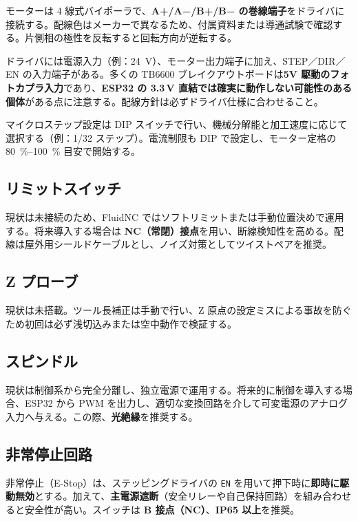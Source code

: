 \documentclass[uplatex,dvipdfmx]{ujarticle}
\begin{document}
モーターは 4 線式バイポーラで、\textbf{A+/A−/B+/B− の巻線端子}をドライバに接続する。配線色はメーカーで異なるため、付属資料または導通試験で確認する。片側相の極性を反転すると回転方向が逆転する。

ドライバには電源入力（例：\SI{24}{\volt}）、モーター出力端子に加え、STEP／DIR／EN の入力端子がある。多くの TB6600 \cite{tb6600}ブレイクアウトボードは\textbf{5V 駆動のフォトカプラ入力}であり、\textbf{ESP32 の 3.3\,V 直結では確実に動作しない可能性のある個体}がある点に注意する。配線方針は必ずドライバ仕様に合わせること。


マイクロステップ設定は DIP スイッチで行い、機械分解能と加工速度に応じて選択する（例：1/32 ステップ）。電流制限も DIP で設定し、モーター定格の \SIrange{80}{100}{\percent} 目安で開始する。

\subsection{リミットスイッチ}

現状は未接続のため、FluidNC ではソフトリミットまたは手動位置決めで運用する。将来導入する場合は \textbf{NC（常閉）接点}を用い、断線検知性を高める。配線は屋外用シールドケーブルとし、ノイズ対策としてツイストペアを推奨。

\subsection{Z プローブ}

現状は未搭載。ツール長補正は手動で行い、Z 原点の設定ミスによる事故を防ぐため初回は必ず浅切込みまたは空中動作で検証する。

\subsection{スピンドル}

現状は制御系から完全分離し、独立電源で運用する。将来的に制御を導入する場合、ESP32 から PWM を出力し、適切な変換回路を介して可変電源のアナログ入力へ与える。この際、\textbf{光絶縁}を推奨する。

\subsection{非常停止回路}

非常停止（E-Stop）は、ステッピングドライバの \texttt{EN} を用いて押下時に\textbf{即時に駆動無効}とする。加えて、\textbf{主電源遮断}（安全リレーや自己保持回路）を組み合わせると安全性が高い。スイッチは \textbf{B 接点（NC）}、\textbf{IP65 以上}を推奨。
\end{document}
